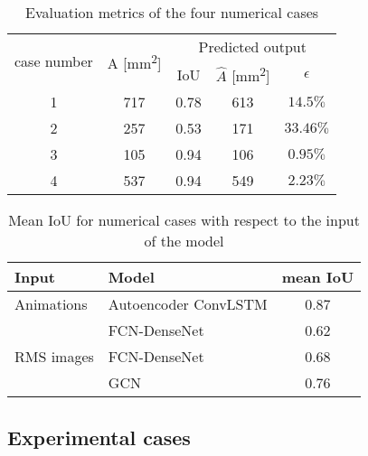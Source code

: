 \begin{table}[!ht]
	\centering
	\caption{Evaluation metrics of the four numerical cases}
	\begin{tabular}{ccccc}
		\toprule
		\multirow{2}{*}{case number} & \multicolumn{1}{c}{\multirow{2}{*}{A [mm\textsuperscript{2}]}} & \multicolumn{3}{c}{Predicted output} \\ 
		\cmidrule(lr){3-5} & & \multicolumn{1}{c}{IoU} & \multicolumn{1}{c}{\(\hat{A}\) [mm\textsuperscript{2}]} & \(\epsilon\) \\
		\midrule
		1 & 717 & \multicolumn{1}{c}{0.78} & \multicolumn{1}{c}{613} & \(14.5\%\) \\ 
		2 & 257 & \multicolumn{1}{c}{0.53} & \multicolumn{1}{c}{171} & \(33.46\%\) \\ 
		3 & 105 & \multicolumn{1}{c}{0.94} & \multicolumn{1}{c}{106} & \(0.95\%\) \\ 
		4 & 537 & \multicolumn{1}{c}{0.94} & \multicolumn{1}{c}{549} & \(2.23\%\) \\ 
		\bottomrule
	\end{tabular}	
	\label{tab:num_cases}
\end{table}
\begin{table}[!ht]
	\centering
	\caption{Mean IoU for numerical cases with respect to the input of the model}
	\begin{tabular}{llc}
		\toprule
		Input & Model & mean IoU \\ 
		\midrule
		Animations & Autoencoder ConvLSTM & 0.87 \\ 
		\midrule
		\multirow{3}{*}{RMS images}  
		& FCN-DenseNet~\cite{Ijjeh2021} & 0.62   \\
		& FCN-DenseNet~\cite{Ijjeh2022} & 0.68   \\
		& GCN~\cite{Ijjeh2022}          & 0.76   \\ 
		\bottomrule
	\end{tabular}
	\label{tab:meanIoU_vs_input}
\end{table}
\clearpage

\subsection{Experimental cases}
\label{sec532}

